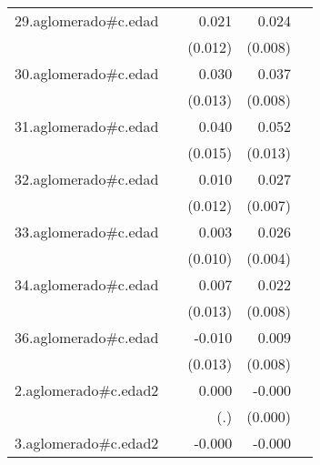 {\begin{longtable}{l*{4}{D{.}{.}{-1}}}
\addlinespace
29.aglomerado#c.edad&                     &       0.021         &       0.024\sym{**} &                     \\
            &                     &     (0.012)         &     (0.008)         &                     \\
\addlinespace
30.aglomerado#c.edad&                     &       0.030\sym{*}  &       0.037\sym{***}&                     \\
            &                     &     (0.013)         &     (0.008)         &                     \\
\addlinespace
31.aglomerado#c.edad&                     &       0.040\sym{**} &       0.052\sym{***}&                     \\
            &                     &     (0.015)         &     (0.013)         &                     \\
\addlinespace
32.aglomerado#c.edad&                     &       0.010         &       0.027\sym{***}&                     \\
            &                     &     (0.012)         &     (0.007)         &                     \\
\addlinespace
33.aglomerado#c.edad&                     &       0.003         &       0.026\sym{***}&                     \\
            &                     &     (0.010)         &     (0.004)         &                     \\
\addlinespace
34.aglomerado#c.edad&                     &       0.007         &       0.022\sym{**} &                     \\
            &                     &     (0.013)         &     (0.008)         &                     \\
\addlinespace
36.aglomerado#c.edad&                     &      -0.010         &       0.009         &                     \\
            &                     &     (0.013)         &     (0.008)         &                     \\
\addlinespace
2.aglomerado#c.edad2&                     &       0.000         &      -0.000         &                     \\
            &                     &         (.)         &     (0.000)         &                     \\
\addlinespace
3.aglomerado#c.edad2&                     &      -0.000         &      -0.000         &                     \\

\end{longtable}}
